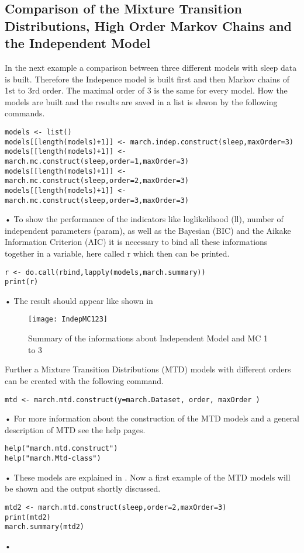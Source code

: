 \subsection{Comparison of the Mixture Transition Distributions, High Order Markov Chains and the Independent Model}
In the next example a comparison between three different models with sleep data is built. Therefore the Indepence model is built first and then Markov chains of 1st to 3rd order. The maximal order of 3 is the same for every model. How the models are built and the results are saved in a list is shwon by the following commands.
\begin{verbatim}
models <- list()
models[[length(models)+1]] <- march.indep.construct(sleep,maxOrder=3)
models[[length(models)+1]] <- march.mc.construct(sleep,order=1,maxOrder=3)
models[[length(models)+1]] <- march.mc.construct(sleep,order=2,maxOrder=3)
models[[length(models)+1]] <- march.mc.construct(sleep,order=3,maxOrder=3)
\end{verbatim}•
To show the performance of the indicators like loglikelihood (ll), number of independent parameters (param), as well as the Bayesian (BIC) and the Aikake Information Criterion (AIC) it is necessary to bind all these informations together in a variable, here called r which then can be printed. 
\begin{verbatim}
r <- do.call(rbind,lapply(models,march.summary))
print(r)
\end{verbatim}•
The result should appear like shown in 
\begin{figure}[h]
    \centering
    \texttt{[image: IndepMC123]}
    \caption{Summary of the informations about Independent Model and MC 1 to 3}
    \label{fig:IndepMC123}
\end{figure}
Further a Mixture Transition Distributions (MTD) models with different orders can be created with the following command.
\begin{verbatim}
mtd <- march.mtd.construct(y=march.Dataset, order, maxOrder )
\end{verbatim}•
For more information about the construction of the MTD models and a general description of MTD see the help pages.
\begin{verbatim}
help("march.mtd.construct")
help("march.Mtd-class")
\end{verbatim}•
These models are explained in \cite{berchtold2002mixture}.
Now a first example of the MTD models will be shown and the output shortly discussed. 
\begin{verbatim}
mtd2 <- march.mtd.construct(sleep,order=2,maxOrder=3)
print(mtd2)
march.summary(mtd2)
\end{verbatim}•
